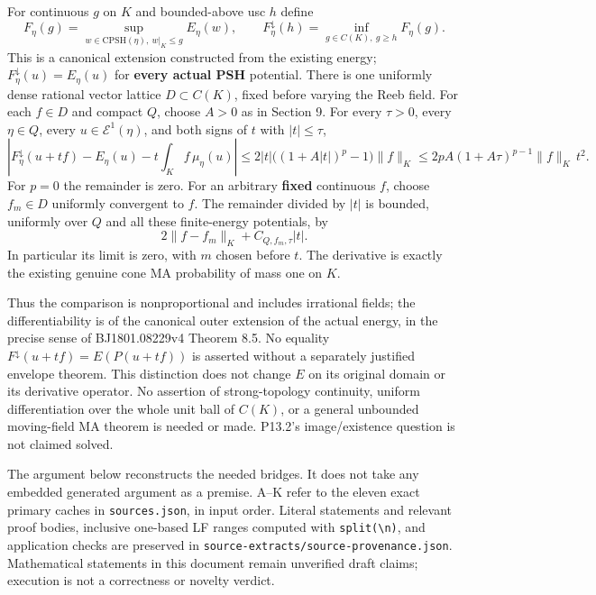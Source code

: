 \documentclass[
  10pt,
]{article}
\begin{document}
For continuous \(g\) on \(K\) and bounded-above usc \(h\) define \[
 F_\eta(g)=\sup_{w\in\mathrm{CPSH}(\eta),\ w|_K\leq g}E_\eta(w),\qquad
 F_\eta^\downarrow(h)=\inf_{g\in C(K),\ g\geq h}F_\eta(g).                                      \tag{4}
\] This is a canonical extension constructed from the existing energy;
\(F_\eta^\downarrow(u)=E_\eta(u)\) for \textbf{every actual PSH}
potential. There is one uniformly dense rational vector lattice
\(D\subset C(K)\), fixed before varying the Reeb field. For each
\(f\in D\) and compact \(Q\), choose \(A>0\) as in Section 9. For every
\(\tau>0\), every \(\eta\in Q\), every \(u\in\mathcal E^1(\eta)\), and
both signs of \(t\) with \(|t|\leq\tau\), \[
 \left|F_\eta^\downarrow(u+tf)-E_\eta(u)-t\int_K f\,\mu_\eta(u)\right|
 \leq 2|t|\big((1+A|t|)^p-1\big)\|f\|_K
 \leq 2pA(1+A\tau)^{p-1}\|f\|_K\,t^2.                                                        \tag{5}
\] For \(p=0\) the remainder is zero. For an arbitrary \textbf{fixed}
continuous \(f\), choose \(f_m\in D\) uniformly convergent to \(f\). The
remainder divided by \(|t|\) is bounded, uniformly over \(Q\) and all
these finite-energy potentials, by
\[ 2\|f-f_m\|_K+C_{Q,f_m,\tau}|t|.                                                            \tag{6}\]
In particular its limit is zero, with \(m\) chosen before \(t\). The
derivative is exactly the existing genuine cone MA probability of mass
one on \(K\).

Thus the comparison is nonproportional and includes irrational fields;
the differentiability is of the canonical outer extension of the actual
energy, in the precise sense of BJ1801.08229v4 Theorem 8.5. No equality
\(F^\downarrow(u+tf)=E(P(u+tf))\) is asserted without a separately
justified envelope theorem. This distinction does not change \(E\) on
its original domain or its derivative operator. No assertion of
strong-topology continuity, uniform differentiation over the whole unit
ball of \(C(K)\), or a general unbounded moving-field MA theorem is
needed or made. P13.2's image/existence question is not claimed solved.

The argument below reconstructs the needed bridges. It does not take any
embedded generated argument as a premise. A--K refer to the eleven exact
primary caches in \texttt{sources.json}, in input order. Literal
statements and relevant proof bodies, inclusive one-based LF ranges
computed with
\texttt{split(\textquotesingle{}\textbackslash{}n\textquotesingle{})},
and application checks are preserved in
\texttt{source-extracts/source-provenance.json}. Mathematical statements
in this document remain unverified draft claims; execution is not a
correctness or novelty verdict.
\end{document}
